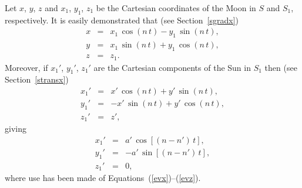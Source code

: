   Let $x$, $y$, $z$ and $x_1$, $y_1$, $z_1$  be the Cartesian coordinates
 of the Moon in $S$ and $S_1$, respectively.
 It is easily demonstrated that (see Section~\ref{sgradx})
 \begin{eqnarray}\label{ev10}
 x&=&x_1\,\cos(n\,t) -y_1\,\sin(n\,t),\\[0.5ex]
 y&=&x_1\,\sin(n\,t)+y_1\,\cos(n\,t),\\[0.5ex]
 z&=&z_1.\label{ev12}
 \end{eqnarray}
 Moreover, if $x_1'$, $y_1'$, $z_1'$  are the Cartesian components of the Sun in $S_1$ then (see Section~\ref{stransx})
 \begin{eqnarray}
 x_1' &=&x'\,\cos(n\,t)+y'\,\sin(n\,t),\\[0.5ex]
 y_1' &=& -x'\,\sin(n\,t) + y'\,\cos(n\,t),\\[0.5ex]
 z_1'&=&z',
 \end{eqnarray}
 giving
 \begin{eqnarray}\label{evxx}
 x_1'&=&a'\,\cos[(n-n')\,t],\\[0.5ex]
 y_1'&=&-a'\,\sin[(n-n')\,t],\\[0.5ex]
 z_1'&=&0,\label{evzz}
 \end{eqnarray}
where use has been made of Equations~(\ref{evx})--(\ref{evz}).

